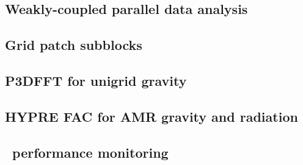 \documentclass{article}
\begin{document}
\vspace{2in}

\subsection{Weakly-coupled parallel data analysis}\label{solution:parallel-data-analysis}

\vspace{2in}

\subsection{Grid patch subblocks} \label{solution:parallel-subblocks}

\vspace{2in}

\subsection{P3DFFT for unigrid gravity} \label{solution:method-p3dfft}

\vspace{2in}

\subsection{HYPRE FAC for AMR gravity and radiation}  \label{solution:method-hypre-fac}

\vspace{2in}

\subsection{\lcaperf\ performance monitoring} \label{solution:performance-lcaperf}
\end{document}
